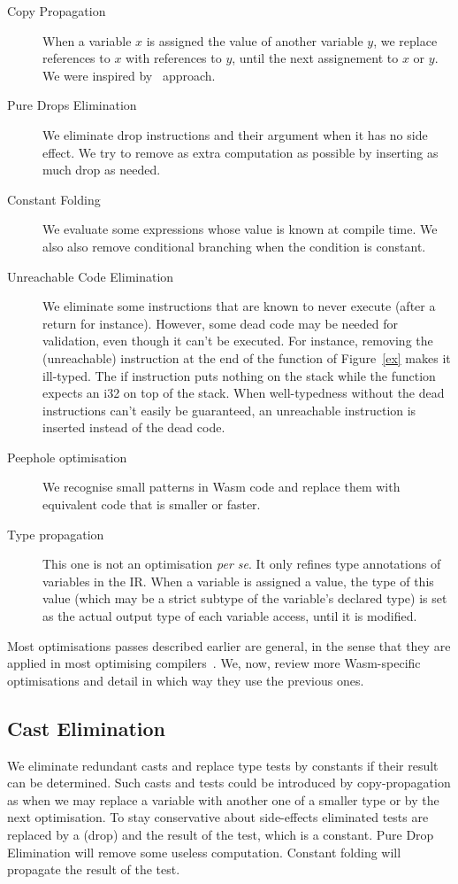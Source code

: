 \documentclass[a4paper,11pt]{article}
\begin{document}
\begin{description}
  \item[Copy Propagation] When a variable $x$ is assigned the value of another
    variable $y$, we replace references to $x$ with references to $y$, until the
    next assignement to $x$ or $y$. We were inspired
    by~\cite[Section~12.5]{muchnick1997advanced} approach.
  \item[Pure Drops Elimination] We eliminate \textsf{drop} instructions and
    their argument when it has no side effect. We try to remove as extra
    computation as possible by inserting as much \textsf{drop} as needed.
  \item[Constant Folding] We evaluate some expressions whose value is known at
    compile time. We also also remove conditional branching when the condition
    is constant.
  \item[Unreachable Code Elimination] We eliminate some instructions that are
    known to never execute (after a \textsf{return} for instance). However, some
    dead code may be needed for validation, even though it can't be executed.
    For instance, removing the \textsf{(unreachable)} instruction at the end of
    the function of Figure~\ref{ex} makes it ill-typed. The \textsf{if}
    instruction puts nothing on the stack while the function expects an
    \textsf{i32} on top of the stack. When well-typedness without the dead
    instructions can't easily be guaranteed, an \textsf{unreachable} instruction
    is inserted instead of the dead code.
  \item[Peephole optimisation] We recognise small patterns in Wasm code and
    replace them with equivalent code that is smaller or faster.
  \item[Type propagation] This one is not an optimisation \emph{per se}. It only
    refines type annotations of variables in the IR. When a variable is assigned
    a value, the type of this value (which may be a strict subtype of the
    variable's declared type) is set as the actual output type of each variable
    access, until it is modified.
\end{description}

Most optimisations passes described earlier are general, in the sense that they
are applied in most optimising compilers~\cite{muchnick1997advanced}. We, now,
review more Wasm-specific optimisations and detail in which way they use the
previous ones.
\subsection{Cast Elimination}
We eliminate redundant casts and replace type tests by constants if their result
can be determined. Such casts and tests could be introduced by copy-propagation
as when we may replace a variable with another one of a smaller type or by the
next optimisation. To stay conservative about side-effects eliminated tests are
replaced by a \textsf{(drop)} and the result of the test, which is a constant.
Pure Drop Elimination will remove some useless computation. Constant folding
will propagate the result of the test.
\end{document}
